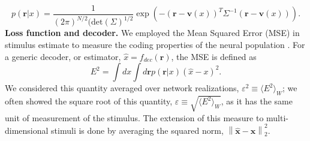 \documentclass[a4paper]{article}%
\begin{document}
\begin{equation}
p\left(  \mathbf{r}|x\right)  = \frac{1}{\left(  2\pi\right)  ^{N/2}
(\text{det}\left(  \Sigma\right)  ^{1/2}} \exp\left(  -\left(  \mathbf{r} -
\mathbf{v}(x)\right)  ^{T}\Sigma^{-1}\left(  \mathbf{r} - \mathbf{v}
(x)\right)  \right)  . \label{Eq:LIn}%
\end{equation}
\newline\newline\textbf{Loss function and decoder.} We employed the Mean
Squared Error (MSE) in stimulus estimate to measure the coding properties of
the neural population \cite{Dayan2001TheoreticalSystems}. For a generic
decoder, or estimator, $\hat{x} = f_{dec}(\mathbf{r})$, the MSE is defined as
\begin{equation}
E^{2} = \int dx \int d\mathbf{r} p(\mathbf{r}|x) \left(  \hat{x} -x\right)
^{2}. \label{Eq:MSE}%
\end{equation}
We considered this quantity averaged over network realizations, $\varepsilon
^{2} \equiv\langle E^{2}\rangle_{W}$; we often showed the square root of this
quantity, $\varepsilon\equiv\sqrt{\langle E^{2}\rangle_{W}}$, as it has the
same unit of measurement of the stimulus. The extension of this measure to
multi-dimensional stimuli is done by averaging the squared norm, $\left\|
\hat{\mathbf{x}} - \mathbf{x}\right\|  _{2}^{2}$.
\end{document}
